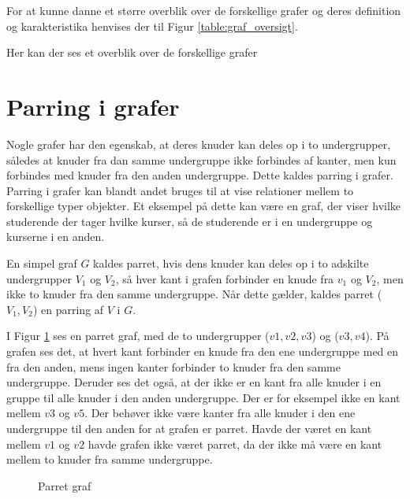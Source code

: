 For at kunne danne et større overblik over de forskellige grafer og deres definition og karakteristika henvises der til Figur \ref{table:graf_oversigt}.

\begin{table}[h]
	
	\caption{Her kan der ses et overblik over de forskellige grafer} \label{table:graf_oversigt}
\end{table}





\section{Parring i grafer}
Nogle grafer har den egenskab, at deres knuder kan deles op i to undergrupper, således at knuder fra dan samme undergruppe ikke forbindes af kanter, men kun forbindes med knuder fra den anden undergruppe.
Dette kaldes parring i grafer.
Parring i grafer kan blandt andet bruges til at vise relationer mellem to forskellige typer objekter.
Et eksempel på dette kan være en graf, der viser hvilke studerende der tager hvilke kurser, så de studerende er i en undergruppe og kurserne i en anden. 

\begin{defn}
En simpel graf $G$ kaldes parret, hvis dens knuder kan deles op i to adskilte undergrupper $V_1$ og $V_2$, så hver kant i grafen forbinder en knude fra $v_1$ og $V_2$, men ikke to knuder fra den samme undergruppe.
Når dette gælder, kaldes parret ($V_1,V_2$) en parring af $V$ i $G$.
\end{defn}

\begin{exmp}
I Figur \ref{parret_graf} ses en parret graf, med de to undergrupper ($v1,v2,v3$) og ($v3,v4$). 
På grafen ses det, at hvert kant forbinder en knude fra den ene undergruppe med en fra den anden, mens ingen kanter forbinder to knuder fra den samme undergruppe. 
Deruder ses det også, at der ikke er en kant fra alle knuder i en gruppe til alle knuder i den anden undergruppe.
Der er for eksempel ikke en kant mellem $v3$ og $v5$. 
Der behøver ikke være kanter fra alle knuder i den ene undergruppe til den anden for at grafen er parret.
Havde der været en kant mellem $v1$ og $v2$ havde grafen ikke været parret, da der ikke må være en kant mellem to knuder fra samme undergruppe.
\end{exmp}

\begin{figure}
\centering
{}
\caption{Parret graf}
\label{parret_graf}
\end{figure}

